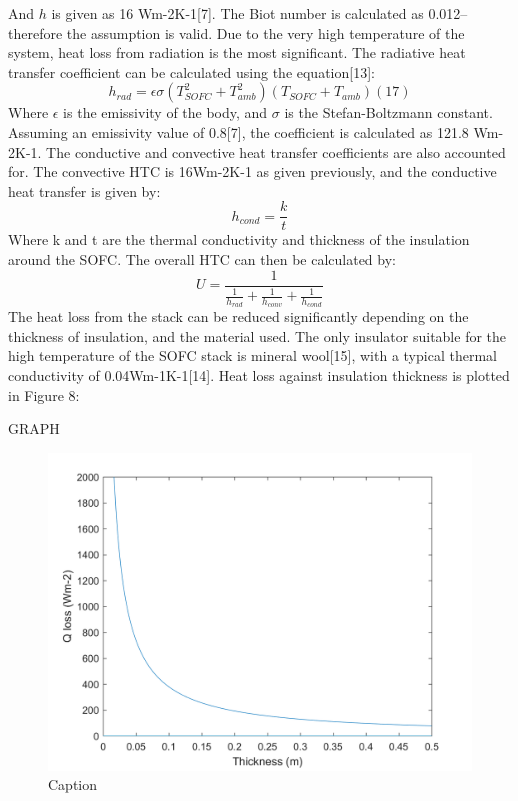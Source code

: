 And $h$ is given as 16 Wm-2K-1[7]. The Biot number is calculated as 0.012– therefore the assumption is valid. Due to the very high temperature of the system, heat loss from radiation is the most significant. The radiative heat transfer coefficient can be calculated using the equation[13]:
\begin{equation}
h_{rad}= \epsilon \sigma (T_{SOFC}^2 + T_{amb}^2)(T_{SOFC}+ T_{amb}) 			(17)
 \end{equation}
Where $\epsilon$ is the emissivity of the body, and $\sigma$ is the Stefan-Boltzmann constant. Assuming an emissivity value of 0.8[7], the coefficient is calculated as 121.8 Wm-2K-1. The conductive and convective heat transfer coefficients are also accounted for. The convective HTC is 16Wm-2K-1 as given previously, and the conductive heat transfer is given by:
\begin{equation}
 h_{cond}=\frac{k}{t}						
  \end{equation}
Where k and t are the thermal conductivity and thickness of the insulation around the SOFC. The overall HTC can then be calculated by:
\begin{equation}
 U=  \frac{1}{\frac{1}{h_{rad}} + \frac{1}{h_{conv}} + \frac{1}{h_{cond}} }						
   \end{equation}
The heat loss from the stack can be reduced significantly depending on the thickness of insulation, and the material used. The only insulator suitable for the high temperature of the SOFC stack is mineral wool[15], with a typical thermal conductivity of 0.04Wm-1K-1[14]. Heat loss against insulation thickness is plotted in Figure 8:

GRAPH
\begin{figure}
    \centering
    \includegraphics[scale=0.25]{insulation_thickness.png}
    \caption{Caption}
    \label{fig:my_label}
\end{figure}

